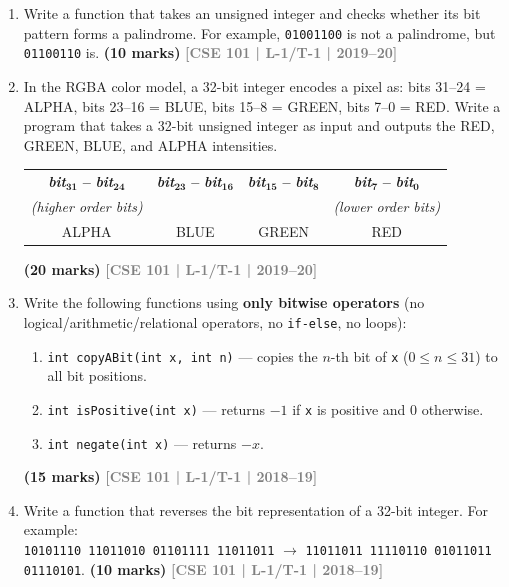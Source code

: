 \documentclass[12pt,a3paper]{article}
\newcommand{\yr}[1]{\hfill\textcolor{gray}{\small\textbf{[#1]}}}
\newcommand{\mk}[1]{\textcolor{orange!70!black}{\small\textbf{(#1 marks)}}}
\begin{document}
\begin{enumerate}
\item Write a function that takes an unsigned integer and checks whether its bit pattern forms a palindrome. For example, \texttt{01001100} is not a palindrome, but \texttt{01100110} is.
\mk{10} \yr{CSE 101 | L-1/T-1 | 2019--20}

\item In the RGBA color model, a 32-bit integer encodes a pixel as: bits 31--24 = ALPHA, bits 23--16 = BLUE, bits 15--8 = GREEN, bits 7--0 = RED. Write a program that takes a 32-bit unsigned integer as input and outputs the RED, GREEN, BLUE, and ALPHA intensities.
\begin{center}
  \renewcommand{\arraystretch}{1.5} %
\begin{tabular}{|c|c|c|c|}
\hline
\rowcolor{pbbblue}
\textbf{\textit{bit}}$_{\mathbf{31}}$ \textbf{--} \textbf{\textit{bit}}$_{\mathbf{24}}$ & 
\textbf{\textit{bit}}$_{\mathbf{23}}$ \textbf{--} \textbf{\textit{bit}}$_{\mathbf{16}}$ & 
\textbf{\textit{bit}}$_{\mathbf{15}}$ \textbf{--} \textbf{\textit{bit}}$_{\mathbf{8}}$ & 
\textbf{\textit{bit}}$_{\mathbf{7}}$ \textbf{--} \textbf{\textit{bit}}$_{\mathbf{0}}$ \\
\rowcolor{pbbblue}
\textit{(higher order bits)} & & & \textit{(lower order bits)} \\
\hline
ALPHA & BLUE & GREEN & RED \\
\hline
\end{tabular}
\end{center}

\mk{20} \yr{CSE 101 | L-1/T-1 | 2019--20}



\item Write the following functions using \textbf{only bitwise operators} (no logical/arithmetic/relational operators, no \texttt{if-else}, no loops):
\begin{enumerate}
  \item \texttt{int copyABit(int x, int n)} --- copies the $n$-th bit of \texttt{x} ($0 \le n \le 31$) to all bit positions.
  \item \texttt{int isPositive(int x)} --- returns $-1$ if \texttt{x} is positive and 0 otherwise.
  \item \texttt{int negate(int x)} --- returns $-x$.
\end{enumerate}
\mk{15} \yr{CSE 101 | L-1/T-1 | 2018--19}

\item Write a function that reverses the bit representation of a 32-bit integer. For example:\\\texttt{10101110 11011010 01101111 11011011} $\to$ \texttt{11011011 11110110 01011011 01110101}.
\mk{10} \yr{CSE 101 | L-1/T-1 | 2018--19}


\end{enumerate}
\end{document}
